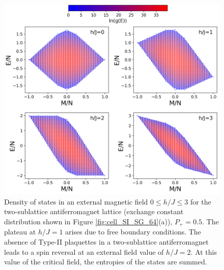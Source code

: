 \documentclass[preprint,12pt]{elsarticle}
\begin{document}
	\begin{figure}[H]
		\centering
		\includegraphics[width=1\linewidth]{pictures/HDOS_SI_64_J0_1.png}
		\caption{Density of states in an external magnetic field $0\leq h/J \leq 3$ for the two-sublattice antiferromagnet lattice (exchange constant distribution shown in Figure \ref{fig:cell_SI_SG_64}(a)), $P_+ = 0.5$. The plateau at $h/J=1$ arises due to free boundary conditions. The absence of Type-II plaquettes in a two-sublattice antiferromagnet leads to a spin reversal at an external field value of $h/J=2$. At this value of the critical field, the entropies of the states are summed.}
		\label{fig:HDOS_ice_1}
	\end{figure}
	
\end{document}
